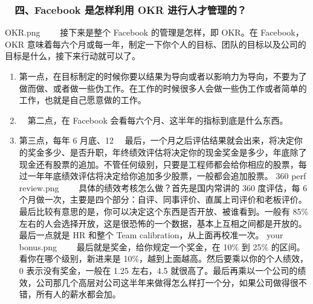 \documentclass[11pt]{ctexart}
\begin{document}
\subsubsection{　四、Facebook 是怎样利用 OKR 进行人才管理的？}
\label{sec:orgheadline27}
OKR.png
　　接下来是整个 Facebook 的管理是怎样，即 OKR。在 Facebook，OKR 意味着每六个月或每一年，制定一下你个人的目标、团队的目标以及公司的目标是什么，接下来行动就可以了。
　　

\begin{enumerate}
\item 第一点，在目标制定的时候你要以结果为导向或者以影响力为导向，不要为了做而做、或者做一些伪工作。在工作的时候很多人会做一些伪工作或者简单的工作，也就是自己愿意做的工作。
\label{sec:orgheadline24}
　

\item 　第二点，在 Facebook 会看每六个月、这半年的指标到底是什么东西。
\label{sec:orgheadline25}
　　

\item 第三点，每年 6 月底、12 　最后，一个月之后评估结果就会出来，将决定你的奖金多少、是否升职，年终绩效评估将决定你的现金奖金是多少，年底除了现金还有股票的追加。不管任何级别，只要是工程师都会给你相应的股票，每过一年年底绩效评估将决定给你追加多少股票，一般都会追加股票。
\label{sec:orgheadline26}
360 perf review.png
　　具体的绩效考核怎么做？首先是国内常讲的 360 度评估，每 6 个月做一次，主要是四个部分：自评、同事评价、直属上司评价和老板评价。最后比较有意思的是，你可以决定这个东西是否开放、被谁看到。一般有 85\% 左右的人会选择开放，这是很恐怖的一个数据，基本上互相之间都是开放的。最后一点就是 HR 和整个 Team calibration，从上面再校准一次。
your bonus.png
　　最后就是奖金，给你规定一个奖金，在 10\% 到 25\% 的区间。看你在哪个级别，新进来是 10\%，越到上面越高。然后要乘以你的个人绩效，0 表示没有奖金，一般在 1.25 左右，4.5 就很高了。最后再乘以一个公司的绩效，公司那几个高层对公司这半年来做得怎么样打一个分，如果公司做得很不错，所有人的薪水都会加。
　
\end{enumerate}
\end{document}
